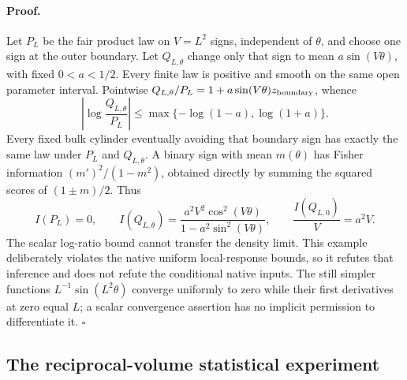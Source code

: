 \paragraph{Proof.}
Let $P_L$ be the fair product law on $V=L^2$ signs, independent of
$\theta$, and choose one sign at the outer boundary. Let $Q_{L,\theta}$
change only that sign to mean $a\sin(V\theta)$, with fixed
$0<a<1/2$. Every finite law is positive and smooth on the same open
parameter interval. Pointwise
$Q_{L,\theta}/P_L=1+a\sin(V\theta)z_{\rm boundary}$, whence
\begin{equation}
 \left|\log\frac{Q_{L,\theta}}{P_L}\right|
 \leq\max\{-\log(1-a),\log(1+a)\}.
 \label{eq:rg-thermo-label-boundary-log-ratio}
\end{equation}
Every fixed bulk cylinder eventually avoiding that boundary sign has
exactly the same law under $P_L$ and $Q_{L,\theta}$. A binary sign with
mean $m(\theta)$ has Fisher information
$(m')^2/(1-m^2)$, obtained directly by summing the squared scores of
$(1\pm m)/2$. Thus
\begin{equation}
 I(P_L)=0,\qquad
 I(Q_{L,\theta})
 =\frac{a^2V^2\cos^2(V\theta)}{1-a^2\sin^2(V\theta)},\qquad
 \frac{I(Q_{L,0})}{V}=a^2V.
 \label{eq:rg-thermo-label-boundary-information}
\end{equation}
The scalar log-ratio bound cannot transfer the density limit. This
example deliberately violates the native uniform local-response
bounds, so it refutes that inference and does not refute the conditional
native inputs. The still simpler functions
$L^{-1}\sin(L^2\theta)$ converge uniformly to zero while their first
derivatives at zero equal $L$; a scalar convergence assertion has no
implicit permission to differentiate it. $\square$

\subsection{The reciprocal-volume statistical experiment}
\label{sec:rg-thermo-label-crossover}

